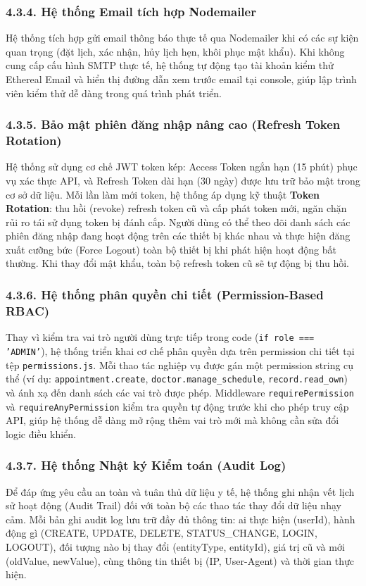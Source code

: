 \documentclass[12pt,a4paper]{report}
\begin{document}
\subsubsection*{4.3.4. Hệ thống Email tích hợp Nodemailer}
\hspace{1em} Hệ thống tích hợp gửi email thông báo thực tế qua Nodemailer khi có các sự kiện quan trọng (đặt lịch, xác nhận, hủy lịch hẹn, khôi phục mật khẩu). Khi không cung cấp cấu hình SMTP thực tế, hệ thống tự động tạo tài khoản kiểm thử Ethereal Email và hiển thị đường dẫn xem trước email tại console, giúp lập trình viên kiểm thử dễ dàng trong quá trình phát triển.

\subsubsection*{4.3.5. Bảo mật phiên đăng nhập nâng cao (Refresh Token Rotation)}
\hspace{1em} Hệ thống sử dụng cơ chế JWT token kép: Access Token ngắn hạn (15 phút) phục vụ xác thực API, và Refresh Token dài hạn (30 ngày) được lưu trữ bảo mật trong cơ sở dữ liệu. Mỗi lần làm mới token, hệ thống áp dụng kỹ thuật \textbf{Token Rotation}: thu hồi (revoke) refresh token cũ và cấp phát token mới, ngăn chặn rủi ro tái sử dụng token bị đánh cắp. Người dùng có thể theo dõi danh sách các phiên đăng nhập đang hoạt động trên các thiết bị khác nhau và thực hiện đăng xuất cưỡng bức (Force Logout) toàn bộ thiết bị khi phát hiện hoạt động bất thường. Khi thay đổi mật khẩu, toàn bộ refresh token cũ sẽ tự động bị thu hồi.

\subsubsection*{4.3.6. Hệ thống phân quyền chi tiết (Permission-Based RBAC)}
\hspace{1em} Thay vì kiểm tra vai trò người dùng trực tiếp trong code (\texttt{if role === 'ADMIN'}), hệ thống triển khai cơ chế phân quyền dựa trên permission chi tiết tại tệp \texttt{permissions.js}. Mỗi thao tác nghiệp vụ được gán một permission string cụ thể (ví dụ: \texttt{appointment.create}, \texttt{doctor.manage\_schedule}, \texttt{record.read\_own}) và ánh xạ đến danh sách các vai trò được phép. Middleware \texttt{requirePermission} và \texttt{requireAnyPermission} kiểm tra quyền tự động trước khi cho phép truy cập API, giúp hệ thống dễ dàng mở rộng thêm vai trò mới mà không cần sửa đổi logic điều khiển.

\subsubsection*{4.3.7. Hệ thống Nhật ký Kiểm toán (Audit Log)}
\hspace{1em} Để đáp ứng yêu cầu an toàn và tuân thủ dữ liệu y tế, hệ thống ghi nhận vết lịch sử hoạt động (Audit Trail) đối với toàn bộ các thao tác thay đổi dữ liệu nhạy cảm. Mỗi bản ghi audit log lưu trữ đầy đủ thông tin: ai thực hiện (userId), hành động gì (CREATE, UPDATE, DELETE, STATUS\_CHANGE, LOGIN, LOGOUT), đối tượng nào bị thay đổi (entityType, entityId), giá trị cũ và mới (oldValue, newValue), cùng thông tin thiết bị (IP, User-Agent) và thời gian thực hiện.
\end{document}
